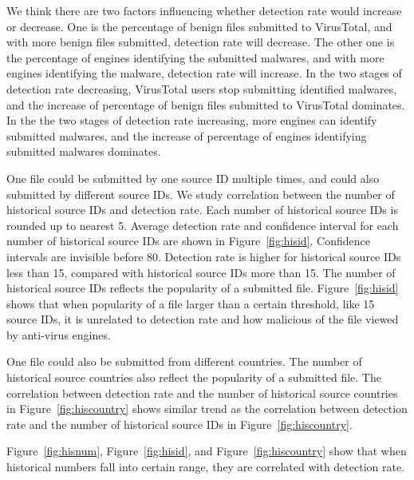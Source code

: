 We think there are two factors influencing whether detection rate would increase or decrease.
One is the percentage of benign files submitted to VirusTotal, 
and with more benign files submitted, detection rate will decrease.   
The other one is the percentage of engines identifying the submitted malwares, 
and with more engines identifying the malware, detection rate will increase. 
In the two stages of detection rate decreasing, 
VirusTotal users stop submitting identified malwares, 
and the increase of percentage of benign files submitted to VirusTotal dominates. 
In the the two stages of detection rate increasing, 
more engines can identify submitted malwares, 
and the increase of percentage of engines identifying submitted malwares dominates. 

One file could be submitted by one source ID multiple times, 
and could also submitted by different source IDs. 
We study correlation between the number of historical source IDs and detection rate. 
Each number of historical source IDs is rounded up to nearest 5. 
Average detection rate and confidence interval for each number of historical source IDs are shown in Figure~\ref{fig:hisid}. 
Confidence intervals are invisible before 80. 
Detection rate is higher for historical source IDs less than 15, compared with historical source IDs more than 15.
The number of historical source IDs reflects the popularity of a submitted file.
Figure~\ref{fig:hisid} shows that when popularity of a file larger than a certain threshold, like 15 source IDs, 
it is unrelated to detection rate and how malicious of the file viewed by anti-virus engines. 


One file could also be submitted from different countries. 
The number of historical source countries also reflect the popularity of a submitted file. 
The correlation between detection rate and the number of historical source countries in 
Figure~\ref{fig:hiscountry} shows similar trend as the correlation between detection rate 
and the number of historical source IDs in Figure~\ref{fig:hiscountry}. 

Figure~\ref{fig:hisnum}, Figure~\ref{fig:hisid}, and Figure~\ref{fig:hiscountry} show that 
when historical numbers fall into certain range, they are correlated with detection rate. 
\fi

